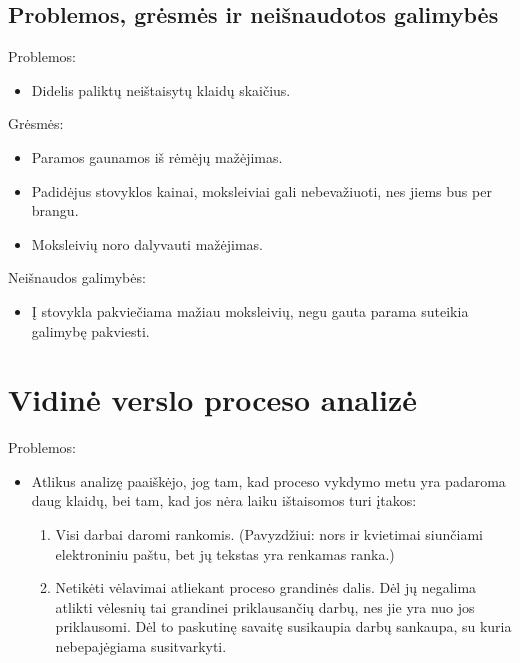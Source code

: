 \subsection{Problemos, grėsmės ir neišnaudotos galimybės}

Problemos:
\begin{itemize}
  \item Didelis paliktų neištaisytų klaidų skaičius.
\end{itemize}

Grėsmės:
\begin{itemize}
  \item Paramos gaunamos iš rėmėjų mažėjimas. 
  \item Padidėjus stovyklos kainai, moksleiviai gali nebevažiuoti, nes 
    jiems bus per brangu.
  \item Moksleivių noro dalyvauti mažėjimas.
\end{itemize}

Neišnaudos galimybės:
\begin{itemize}
  \item Į stovykla pakviečiama mažiau moksleivių, negu gauta parama
    suteikia galimybę pakviesti.        %
\end{itemize}

\section{Vidinė verslo proceso analizė}

Problemos:
\begin{itemize}
  \item Atlikus analizę paaiškėjo, jog tam, kad proceso vykdymo metu yra
    padaroma daug klaidų, bei tam, kad jos nėra laiku ištaisomos turi
    įtakos:
    \begin{enumerate}
      \item Visi darbai daromi rankomis. (Pavyzdžiui: nors ir kvietimai
        siunčiami elektroniniu paštu, bet jų tekstas yra renkamas ranka.)
      \item Netikėti vėlavimai atliekant proceso grandinės dalis. Dėl jų 
        negalima atlikti vėlesnių tai grandinei priklausančių darbų, nes
        jie yra nuo jos priklausomi. Dėl to paskutinę savaitę susikaupia
        darbų sankaupa, su kuria nebepajėgiama susitvarkyti.
    \end{enumerate}
\end{itemize}

